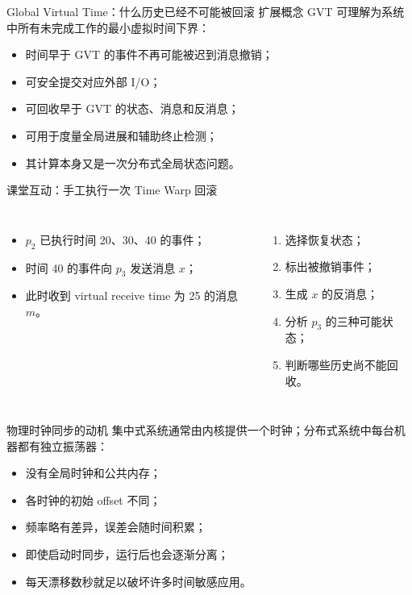 \documentclass[UTF8,fontset=none,aspectratio=169,10pt]{beamer}
\begin{document}
\begin{frame}{Global Virtual Time：什么历史已经不可能被回滚}
扩展概念 GVT 可理解为系统中所有未完成工作的最小虚拟时间下界：
\begin{itemize}
  \item 时间早于 GVT 的事件不再可能被迟到消息撤销；
  \item 可安全提交对应外部 I/O；
  \item 可回收早于 GVT 的状态、消息和反消息；
  \item 可用于度量全局进展和辅助终止检测；
  \item 其计算本身又是一次分布式全局状态问题。
\end{itemize}
\end{frame}

\begin{frame}{课堂互动：手工执行一次 Time Warp 回滚}
\begin{columns}[T,onlytextwidth]
\begin{itemize}
  \item $p_2$ 已执行时间 20、30、40 的事件；
  \item 时间 40 的事件向 $p_3$ 发送消息 $x$；
  \item 此时收到 virtual receive time 为 25 的消息 $m$。
\end{itemize}
\begin{enumerate}
  \item 选择恢复状态；
  \item 标出被撤销事件；
  \item 生成 $x$ 的反消息；
  \item 分析 $p_3$ 的三种可能状态；
  \item 判断哪些历史尚不能回收。
\end{enumerate}
\end{columns}
\end{frame}


\begin{frame}{物理时钟同步的动机}
集中式系统通常由内核提供一个时钟；分布式系统中每台机器都有独立振荡器：
\begin{itemize}
  \item 没有全局时钟和公共内存；
  \item 各时钟的初始 offset 不同；
  \item 频率略有差异，误差会随时间积累；
  \item 即使启动时同步，运行后也会逐渐分离；
  \item 每天漂移数秒就足以破坏许多时间敏感应用。
\end{itemize}
\end{frame}
\end{document}
